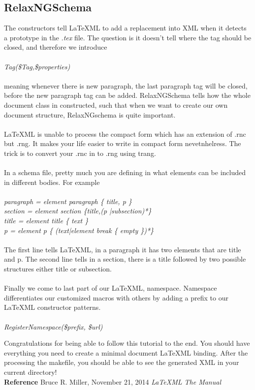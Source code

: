 \documentclass{book}
\begin{document}
\subsection{RelaxNGSchema}
The constructors tell \LaTeX ML to add a replacement into XML when it detects a prototype in the \emph{.tex} file. The question is it doesn't tell
where the tag should be closed, and therefore we introduce \\ \\
 \emph{Tag(\$Tag,\$properties)} \\ \\
 meaning whenever there is new paragraph, the last paragraph tag will be closed, before the new paragraph tag can be added. RelaxNGSchema
 tells how the whole document class in constructed, such that when we want to create our own document structure, RelaxNGschema is quite important. \\ \\
 \LaTeX ML is unable to process the compact form which has an extension of .rnc but .rng. It makes your life easier to write in compact form nevetnhelress.
 The trick is to convert your .rnc in to .rng using trang. \\ \\ 
 In a schema file, pretty much you are defining in what elements can be included in different bodies. For example \\ \\
\emph{paragraph = element paragraph \{ title, p \} \\
section = element section \{title,(p |subsection)*\} \\
title = element title \{ text \} \\ 
p = element p \{ (text|element break \{ empty \})*\} }\\ \\ 
The first line tells \LaTeX ML, in a paragraph it has two elements that are title and p. The second line tells in a section, there is a title followed by two possible \\
structures either title or subsection. \\ \\
Finally we come to last part of our \LaTeX ML, namespace. Namespace differentiates our customized macros with others by adding a prefix to our \LaTeX ML constructor patterns. \\ \\
\emph{RegisterNamespace(\$prefix, \$url) \\} 

Congratulations for being able to follow this tutorial to the end. You should have everything you need to create a minimal document \LaTeX ML binding. After the processing the makefile, you should be able to see the generated XML in your current directory! \\

\textbf{Reference} Bruce R. Miller, November 21, 2014 \emph{\LaTeX ML The Manual}
\end{document}
